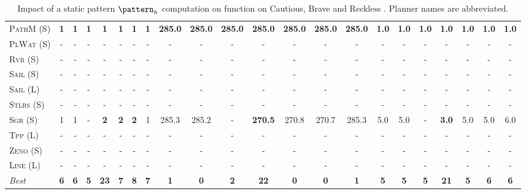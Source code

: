 \documentclass[11pt,landscape]{article}
\begin{document}
\begin{table}[tb]
{\begin{tabular}{|l||ccccccc||ccccccc||ccccccc||}
\textsc{PathM} (S)&\textbf{1}&\textbf{1}&\textbf{1}&\textbf{1}&\textbf{1}&\textbf{1}&\textbf{1}&\textbf{285.0}&\textbf{285.0}&\textbf{285.0}&\textbf{285.0}&\textbf{285.0}&\textbf{285.0}&\textbf{285.0}&\textbf{1.0}&\textbf{1.0}&\textbf{1.0}&\textbf{1.0}&\textbf{1.0}&\textbf{1.0}&\textbf{1.0}\\
\textsc{PlWat} (S)&-&-&-&-&-&-&-&-&-&-&-&-&-&-&-&-&-&-&-&-&-\\
\textsc{Rvr} (S)&-&-&-&-&-&-&-&-&-&-&-&-&-&-&-&-&-&-&-&-&-\\
\textsc{Sail} (S)&-&-&-&-&-&-&-&-&-&-&-&-&-&-&-&-&-&-&-&-&-\\
\textsc{Sail} (L)&-&-&-&-&-&-&-&-&-&-&-&-&-&-&-&-&-&-&-&-&-\\
\textsc{Stlrs} (S)&-&-&-&-&-&-&-&-&-&-&-&-&-&-&-&-&-&-&-&-&-\\
\textsc{Sgr} (S)&1&1&-&\textbf{2}&\textbf{2}&\textbf{2}&1&285.3&285.2&-&\textbf{270.5}&270.8&270.7&285.3&5.0&5.0&-&\textbf{3.0}&5.0&5.0&6.0\\
\textsc{Tpp} (L)&-&-&-&-&-&-&-&-&-&-&-&-&-&-&-&-&-&-&-&-&-\\
\textsc{Zeno} (S)&-&-&-&-&-&-&-&-&-&-&-&-&-&-&-&-&-&-&-&-&-\\
\textsc{Line} (L)&-&-&-&-&-&-&-&-&-&-&-&-&-&-&-&-&-&-&-&-&-
\\\hline
\textit{Best}&\textbf{6}&\textbf{6}&\textbf{5}&\textbf{23}&\textbf{7}&\textbf{8}&\textbf{7}&\textbf{1}&\textbf{0}&\textbf{2}&\textbf{22}&\textbf{0}&\textbf{0}&\textbf{1}&\textbf{5}&\textbf{5}&\textbf{5}&\textbf{21}&\textbf{5}&\textbf{6}&\textbf{6}\\\hline

        \end{tabular}}
        \caption{Impact of a static pattern $\pattern_h$ computation on function on Cautious, Brave and Reckless \pattyd. Planner names are abbreviated.}
        \label{tab:abl-patternh-static}
        \end{table}
        
\end{document}
